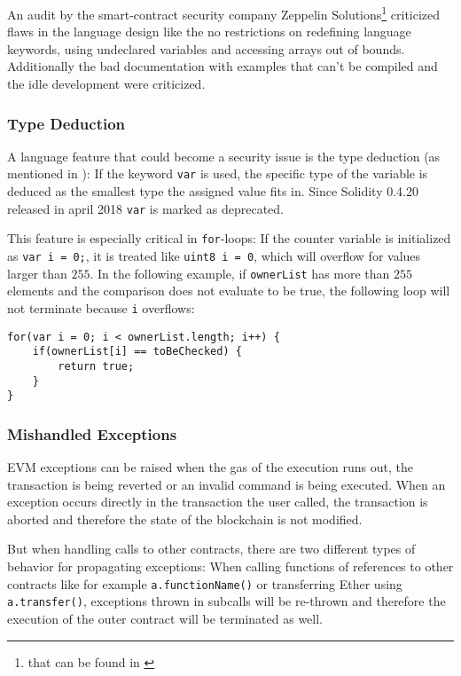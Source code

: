 An audit by the smart-contract security company Zeppelin Solutions\footnote{that can be found in \cite{augur:serpentaudit}} criticized flaws in the language design like the no restrictions on redefining language keywords, using undeclared variables and accessing arrays out of bounds. Additionally the bad documentation with examples that can't be compiled and the idle development were criticized.

\subsubsection{Type Deduction}
A language feature that could become a security issue is the type deduction (as mentioned in \cite[Security Considerations; Minor details]{ethereum:solidity}): If the keyword \texttt{var} is used, the specific type of the variable is deduced as the smallest type the assigned value fits in. Since Solidity 0.4.20 released in april 2018 \texttt{var} is marked as deprecated.

This feature is especially critical in \texttt{for}-loops: If the counter variable is initialized as \texttt{var i = 0;}, it is treated like \texttt{uint8 i = 0}, which will overflow for values larger than \( 255 \). In the following example, if \texttt{ownerList} has more than \( 255 \) elements and the comparison does not evaluate to be true, the following loop will not terminate because \texttt{i} overflows:
\begin{verbatim}
for(var i = 0; i < ownerList.length; i++) {
    if(ownerList[i] == toBeChecked) {
        return true;
    }
}
\end{verbatim}

\subsubsection{Mishandled Exceptions}
\label{section:vulnerabilities:interaction:mishandledexceptions}
EVM exceptions can be raised when the gas of the execution runs out, the transaction is being reverted or an invalid command is being executed. When an exception occurs directly in the transaction the user called, the transaction is aborted and therefore the state of the blockchain is not modified.

But when handling calls to other contracts, there are two different types of behavior for propagating exceptions: When calling functions of references to other contracts like for example \texttt{a.functionName()} or transferring Ether using \texttt{a.transfer()}, exceptions thrown in subcalls will be re-thrown and therefore the execution of the outer contract will be terminated as well.

